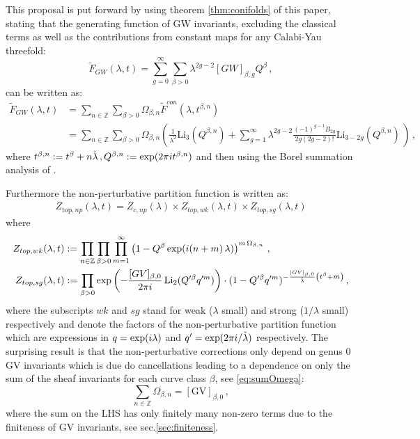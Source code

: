 \documentclass[a4paper,12pt,justification=centering]{article}
\numberwithin{equation}{section}
\newcommand{\ii}{\textnormal{i}}
\theoremstyle{plain}%
\theoremstyle{definition}
\begin{document}
This proposal is put forward by using theorem  \ref{thm:conifolds} of this paper, stating that  the generating function of GW invariants, excluding the classical terms as well as the contributions from constant maps for any Calabi-Yau threefold:
\begin{equation}
\tilde{F}_{GW}(\lambda,t)= \sum_{g=0}^{\infty}\sum_{\beta>0}  \lambda^{2g-2} [GW]_{\beta,g} Q^{\beta}\,,
\end{equation} 
can be written as:
\begin{align}
\tilde{F}_{GW}(\lambda,t)&=  \sum_{n\in \mathbb{Z}}  \sum_{\beta>0}   \Omega_{\beta,n} \widetilde{F}^{con} (\lambda, t^{\beta,n}) \, \\
&=\sum_{n\in \mathbb{Z}}  \sum_{\beta>0}   \Omega_{\beta,n}  \left( \frac{1}{\lambda^2} \mathrm{Li}_{3}(Q^{\beta,n})+ \sum_{g=1}^{\infty} \lambda^{2g-2} \frac{(-1)^{g-1}B_{2g}}{2g (2g-2)!} \mathrm{Li}_{3-2g} (Q^{\beta,n}) \, \right)\,,
\end{align}
where $t^{\beta,n}:=t^{\beta}+ n \check{\lambda}\,,Q^{\beta,n}:=\exp(2\pi \ii t^{\beta,n})$  and then using the Borel summation analysis of \cite{Alim:2021mhp}.

Furthermore the non-perturbative partition function is written as:
\begin{align}
Z_{\textrm{top},np}(\lambda,t) =  Z_{c,np}(\lambda) \times Z_{top,wk}(\lambda,t) \times Z_{top,sg}(\lambda,t)
\end{align}
where
\begin{align}
 Z_{top,wk}(\lambda,t)&:= \prod_{n\in \mathbb{Z}}  \prod_{\beta>0}  \prod_{m=1}^{\infty}   \left(1-   Q^{\beta}   \exp(\ii (n+m) \,\lambda) \right)^{m\, \Omega_{\beta,n}}\,,\\
 Z_{top,sg}(\lambda,t) &:=   \prod_{\beta>0} \exp\left(-\frac{[\textrm{GV}]_{\beta,0}}{2\pi i} \operatorname{Li}_2(Q'^{\beta} q'^m)\right) \cdot (1-Q'^{\beta} q'^m)^{-\frac{ [\textrm{GV}]_{\beta,0}}{\check{\lambda}}\left( t^{\beta}+m\right)}\,,
\end{align}
where the subscripts $wk$ and $sg$ stand for weak ($\lambda$ small) and strong ($1/\lambda $ small) respectively and denote the factors of the non-perturbative partition function which are expressions in $q=\exp(\ii \lambda)$ and $q'=\exp(2\pi \ii /\check{\lambda})$ respectively. The surprising result is that the non-perturbative corrections only depend on genus $0$ GV invariants which is due do cancellations leading to a dependence on only the sum of the sheaf invariants for each curve class $\beta$, see \eqref{eq:sumOmega}:
\begin{equation}
\sum_{n\in \mathbb{Z}} \Omega_{\beta,n}  = [\textrm{GV}]_{\beta,0}\,,
\end{equation}
where the sum on the LHS has only finitely many non-zero terms due to the finiteness of GV invariants, see sec.\ref{sec:finiteness}.
\end{document}
